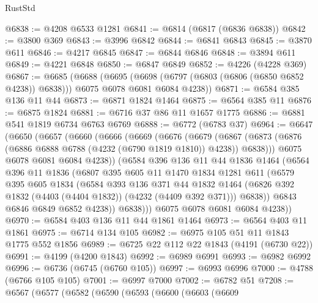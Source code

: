 \begin{lexlean}{RustStd}
\begin{coremodule}
@6838 := @4208 @6533 @1281
@6841 := @6814 (@6817 (@6836 @6838))
@6842 := @3800 @369
@6843 := @3996 @6842
@6844 := @6841 @6843
@6845 := @3870 @611
@6846 := @4217 @6845
@6847 := @6844 @6846
@6848 := @3894 @611
@6849 := @4221 @6848
@6850 := @6847 @6849
@6852 := @4226 (@4228 @369)
@6867 := @6685
    (@6688
      (@6695
        (@6698 (@6797 (@6803 (@6806 (@6850 @6852 @4238)) @6838)))
        @6075
        @6078
        @6081
        @6084
        @4238))
@6871 := @6584 @385 @136 @11 @44
@6873 := @6871 @1824 @1464
@6875 := @6564 @385 @11
@6876 := @6875 @1824
@6881 := @6716 @37 @86 @11 @1657 @1775
@6886 := @6881 @541 @1819 @6734 @6763 @6769
@6888 := @6772 (@6783 @37)
@6964 := @6647
    (@6650
      (@6657
        (@6660
          (@6666
            (@6669
              (@6676
                (@6679
                  (@6867
                    (@6873 (@6876 (@6886 @6888 @6788 (@4232 (@6790 @1819 @1810)) @4238)) @6838)))
                @6075
                @6078
                @6081
                @6084
                @4238))
            (@6584
              @396
              @136
              @11
              @44
              @1836
              @1464
              (@6564
                @396
                @11
                @1836
                (@6807
                  @395
                  @605
                  @11
                  @1470
                  @1834
                  @1281
                  @611
                  (@6579
                    @395
                    @605
                    @1834
                    (@6584
                      @393
                      @136
                      @371
                      @44
                      @1832
                      @1464
                      (@6826 @392 @1832 (@4403 (@4404 @1832)) (@4232 (@4409 @392 @371)))
                      @6838))
                  @6843
                  @6846
                  @6849
                  @6852
                  @4238))
              @6838)))
        @6075
        @6078
        @6081
        @6084
        @4238))
@6970 := @6584 @403 @136 @11 @44 @1861 @1464
@6973 := @6564 @403 @11 @1861
@6975 := @6714 @134 @105
@6982 := @6975 @105 @51 @11 @1843 @1775 @552 @1856
@6989 := @6725 @22 @112 @22 @1843 (@4191 (@6730 @22))
@6991 := @4199 (@4200 @1843)
@6992 := @6989 @6991
@6993 := @6982 @6992
@6996 := @6736 (@6745 (@6760 @105))
@6997 := @6993 @6996
@7000 := @4788 (@6766 @105 @105)
@7001 := @6997 @7000
@7002 := @6782 @51
@7208 := @6567
    (@6577
      (@6582
        (@6590
          (@6593
            (@6600
              (@6603
                (@6609

\end{coremodule}
\end{lexlean}
